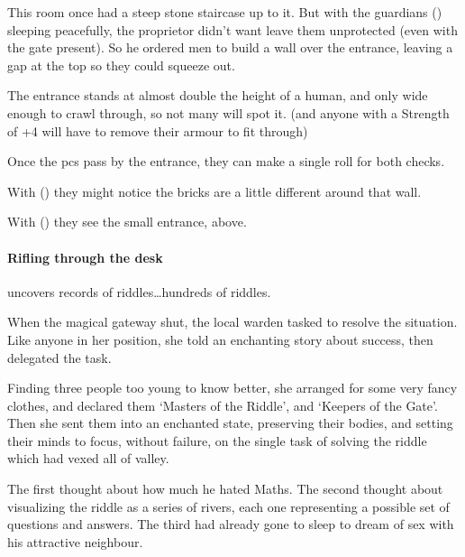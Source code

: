 \begin{multicols}{2}
\showStdSpells[
  \setcounter{diceNo}{0}
]


\begin{exampletext}
  This room once had a steep stone staircase up to it.
  But with the guardians () sleeping peacefully, the proprietor didn't want leave them unprotected (even with the gate present).
  So he ordered men to build a wall over the entrance, leaving a gap at the top so they could squeeze out.
\end{exampletext}

The entrance stands at almost double the height of a human, and only wide enough to crawl through, so not many will spot it.
(and anyone with a Strength of +4 will have to remove their armour to fit through)

Once the \glspl{pc} pass by the entrance, they can make a single roll for both checks.

With  (\tn[14]) they might notice the bricks are a little different around that wall.

With  (\tn[12]) they see the small entrance, above.

\paragraph{Rifling through the desk}
uncovers records of riddles\ldots hundreds of riddles.


\begin{exampletext}
  When the magical gateway shut, the local \gls{warden} tasked  to resolve the situation.
  Like anyone in her position, she told an enchanting story about success, then delegated the task.

  Finding three people too young to know better, she arranged for some very fancy clothes, and declared them `Masters of the Riddle', and `Keepers of the Gate'.
  Then she sent them into an enchanted state, preserving their bodies, and setting their minds to focus, without failure, on the single task of solving the riddle which had vexed all of \gls{valley}.

  The first thought about how much he hated Maths.
  The second thought about visualizing the riddle as a series of rivers, each one representing a possible set of questions and answers.
  The third had already gone to sleep to dream of sex with his attractive neighbour.


\end{exampletext}
\end{multicols}
